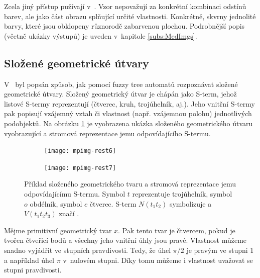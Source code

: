 Zcela jiný přístup pužívají v~\cite{WanJiaZhoDu-ImProcBasFuzCelAuMod}. Vzor nepovažují za konkrétní kombinaci odstínů barev, ale jako část obrazu splňující určité vlastnosti. Konkrétně, skvrny jednolité barvy, které jsou obklopeny různorodě zabarvenou plochou. Podrobnější popis (včetně ukázky výstupů) je uveden v~kapitole \ref{subs:MedImgs}.

\subsection{Složené geometrické útvary} \label{subs:CompGeoms}

V~\cite{Lee-FuzTreAutSynPatRec} byl popsán způsob, jak pomocí fuzzy tree automatů rozpoznávat složené geometrické útvary. Složený geometrický útvar je chápán jako S-term, jehož listové S-termy reprezentují  (čtverec, kruh, trojúhelník, aj.). Jeho vnitřní S-termy pak popisují vzájemný vztah či vlastnost (např. vzájemnou polohu) jednotlivých podobjektů. Na obrázku \ref{img:Geoms} je vyobrazena ukázka složeného geometrického útvaru vyobrazující  a stromová reprezentace jemu odpovídajícího S-termu.


\begin{figure} 
 \hfill
 \begin{subfigure}{0.4\textwidth}
  \texttt{[image: mpimg-rest6]}
 \end{subfigure} %
 \hfill %
 \begin{subfigure}{0.4\textwidth}
  \texttt{[image: mpimg-rest7]}
 \end{subfigure}
 \hfill
 
 \caption[Příklad složeného geometrického tvaru]{Příklad složeného geometrického tvaru a stromová reprezentace jemu odpovídajícímu S-termu. Symbol $t$ reprezentuje trojúhelník, symbol $o$ obdélník, symbol $c$ čtverec. S-term $N(t_1 t_2)$ symbolizuje  a $V(t_1 t_2 t_3)$ značí .} \label{img:Geoms}
\end{figure}

Mějme primitivní geometrický tvar $x$. Pak tento tvar je čtvercem, pokud je tvořen čtveřicí bodů a všechny jeho vnitřní úhly jsou pravé. Vlastnost  můžeme snadno vyjádřit ve stupních pravdivosti. Tedy, že úhel $\pi/2$ je pravým ve stupni $1$ a například úhel $\pi$ v~nulovém stupni. Díky tomu můžeme i vlastnost  uvažovat se stupni pravdivosti.

